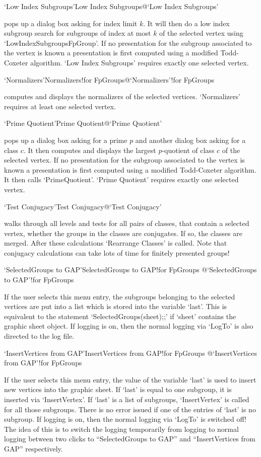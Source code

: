 \>`Low Index Subgroups'{Low Index Subgroups}@{`Low Index Subgroups'}

pops up a dialog box asking for index  limit $k$.  It  will then do a low
index subgroup search for  subgroups of index at  most $k$ of the selected
vertex using `LowIndexSubgroupsFpGroup'.    If no  presentation  for  the
subgroup   associated to  the vertex  is  known a  presentation  is first
computed using a  modified  Todd-Coxeter algorithm. `Low Index Subgroups'
requires  exactly one selected vertex.

\>`Normalizers'{Normalizers!for FpGroups}@{`Normalizers'!for FpGroups}

computes and displays the normalizers of the selected vertices.
`Normalizers' requires at least one selected vertex.

\>`Prime Quotient'{Prime Quotient}@{`Prime Quotient'}

pops up a dialog box asking for a prime $p$ and another dialog box asking
for a class $c$.  It then  computes and displays the largest $p$-quotient
of class $c$ of the selected vertex.  If no presentation for the subgroup
associated to the vertex is known a  presentation is first computed using
a   modified  Todd-Coxeter algorithm.   It    then calls `PrimeQuotient'.
`Prime Quotient' requires exactly one selected vertex.

\>`Test Conjugacy'{Test Conjugacy}@{`Test Conjugacy'}

walks through all levels and tests for all pairs of classes, that contain a 
selected vertex, whether the groups in the classes are conjugates. If so,
the classes are merged. After these calculations `Rearrange Classes' is
called. Note that conjugacy calculations can take lots of time for finitely 
presented groups!

\>`SelectedGroups to GAP'{SelectedGroups to GAP!for FpGroups}%
@{`SelectedGroups to GAP'!for FpGroups}

If  the  user  selects  this menu entry,  the  subgroups   belonging to the
selected  vertices are put into a  list which  is  stored into the variable
`last'.  This is equivalent  to the  statement `SelectedGroups(sheet);;' if
`sheet' contains the graphic sheet  object. If {\XGAP}  logging is on, then
the normal {\GAP} logging via `LogTo'  is also directed  to the {\XGAP} log
file.

\>`InsertVertices from GAP'{InsertVertices from GAP!for FpGroups}%
@{`InsertVertices from GAP'!for FpGroups}

If the user selects this  menu entry, the  value of the variable `last'  is
used to insert new vertices into the graphic sheet.  If  `last' is equal to
one subgroup, it  is inserted via  `InsertVertex'. If `last'  is a list  of
subgroups, `InsertVertex' is  called for all  those subgroups. There is  no
error  issued if one of  the entries of `last'   is no subgroup. If {\XGAP}
logging is on, then the normal {\GAP} logging via `LogTo'  is switched off! 
The idea of this is to switch  the logging temporarily from {\XGAP} logging
to normal  {\GAP} logging between two clicks  to  ``SelectedGroups to GAP''
and ``InsertVertices from GAP'' respectively.

